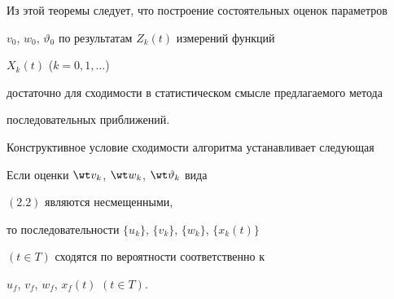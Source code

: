  


Из этой теоремы следует, что построение состоятельных оценок параметров 


$v_0$, $w_0$, $\vartheta_0$ по результатам $Z_k(t)$ измерений функций 


$X_k(t)$ ($k=0,1,\dotsc$) 


достаточно для сходимости в статистическом смысле предлагаемого метода 


последовательных приближений. 


 


Конструктивное условие сходимости алгоритма устанавливает следующая 


 


\begin{thm} Если оценки $\wt v_k$, $\wt w_k$, $\wt\vartheta_k$ вида 


$(2.2)$ являются несмещенными, 


то последовательности $\{u_k\}$, $\{v_k\}$, $\{w_k\}$, $\{x_k(t)\}$ 


$(t\in T)$ сходятся по вероятности соответственно к 


$u_f$, $v_f$, $w_f$, $x_f(t)$ $(t\in T)$. 


\end{thm} 


 


